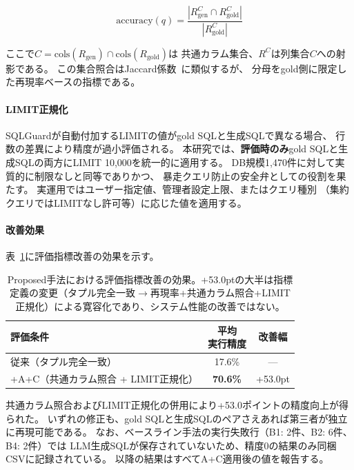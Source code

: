 \documentclass[5p,twocolumn]{elsarticle}
\begin{document}
\begin{equation}
  \text{accuracy}(q) = \frac{|R_\text{gen}^{C} \cap R_\text{gold}^{C}|}{|R_\text{gold}^{C}|}
  \label{eq:column_aware}
\end{equation}

ここで$C = \text{cols}(R_\text{gen}) \cap \text{cols}(R_\text{gold})$は
共通カラム集合、$R^C$は列集合$C$への射影である。
この集合照合はJaccard係数~\citep{jaccard1912distribution}に類似するが、
分母をgold側に限定した再現率ベースの指標である。

\paragraph{LIMIT正規化}
SQLGuardが自動付加するLIMITの値がgold SQLと生成SQLで異なる場合、
行数の差異により精度が過小評価される。
本研究では、\textbf{評価時のみ}gold SQLと生成SQLの両方にLIMIT 10{,}000を統一的に適用する。
DB規模1{,}470件に対して実質的に制限なしと同等でありかつ、
暴走クエリ防止の安全弁としての役割を果たす。
実運用ではユーザー指定値、管理者設定上限、またはクエリ種別
（集約クエリではLIMITなし許可等）に応じた値を適用する。

\paragraph{改善効果}
表~\ref{tab:metric_improvement}に評価指標改善の効果を示す。

\begin{table}[htbp]
  \centering
  \caption{Proposed手法における評価指標改善の効果。+53.0ptの大半は指標定義の変更（タプル完全一致$\to$再現率+共通カラム照合+LIMIT正規化）による寛容化であり、システム性能の改善ではない。}
  \label{tab:metric_improvement}
  \small
  \begin{tabular}{p{4.8cm}cc}
    \toprule
    評価条件 & \shortstack{平均\\実行精度} & 改善幅 \\
    \midrule
    従来（タプル完全一致） & 17.6\% & --- \\
    +A+C（共通カラム照合 + LIMIT正規化） & \textbf{70.6\%} & +53.0pt \\
    \bottomrule
  \end{tabular}
\end{table}

共通カラム照合およびLIMIT正規化の併用により+53.0ポイントの精度向上が得られた。
いずれの修正も、gold SQLと生成SQLのペアさえあれば第三者が独立に再現可能である。
なお、ベースライン手法の実行失敗行（B1: 2件、B2: 6件、B4: 2件）では
LLM生成SQLが保存されていないため、精度0の結果のみ同梱CSVに記録されている。
以降の結果はすべてA+C適用後の値を報告する。
\end{document}
